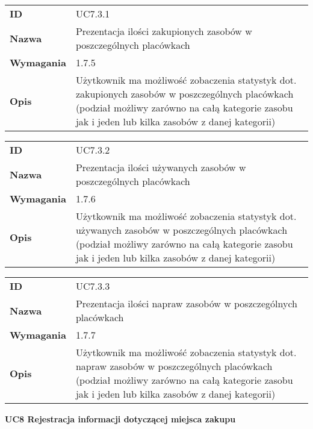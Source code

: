 \vspace{.05\textheight}

\begin{tabular}{p{}p{}}
\hfill {\bf ID} & UC7.3.1 \\
\hfill {\bf Nazwa} & Prezentacja ilości zakupionych zasobów w poszczególnych placówkach \\
\hfill {\bf Wymagania} & 1.7.5 \\
\hfill {\bf Opis} & Użytkownik ma możliwość zobaczenia statystyk dot. zakupionych zasobów w poszczególnych placówkach (podział możliwy zarówno na całą kategorie zasobu jak i jeden lub kilka zasobów z danej kategorii) \\
\end{tabular}

\vspace{.05\textheight}

\begin{tabular}{p{}p{}}
\hfill {\bf ID} & UC7.3.2 \\
\hfill {\bf Nazwa} &  Prezentacja ilości używanych zasobów w poszczególnych placówkach \\
\hfill {\bf Wymagania} & 1.7.6  \\
\hfill {\bf Opis} &  Użytkownik ma możliwość zobaczenia statystyk dot. używanych zasobów w poszczególnych placówkach (podział możliwy zarówno na całą kategorie zasobu jak i jeden lub kilka zasobów z danej kategorii) \\
\end{tabular}

\vspace{.05\textheight}

\begin{tabular}{p{}p{}}
\hfill {\bf ID} & UC7.3.3 \\
\hfill {\bf Nazwa} & Prezentacja ilości napraw zasobów w poszczególnych placówkach \\
\hfill {\bf Wymagania} & 1.7.7 \\
\hfill {\bf Opis} &  Użytkownik ma możliwość zobaczenia statystyk dot. napraw zasobów w poszczególnych placówkach (podział możliwy zarówno na całą kategorie zasobu jak i jeden lub kilka zasobów z danej kategorii) \\
\end{tabular}

\vspace{.03\textheight}
\begin{center}
  {\Large\bf UC8 Rejestracja informacji dotyczącej miejsca zakupu} \\
\end{center}
\vspace{.02\textheight}


